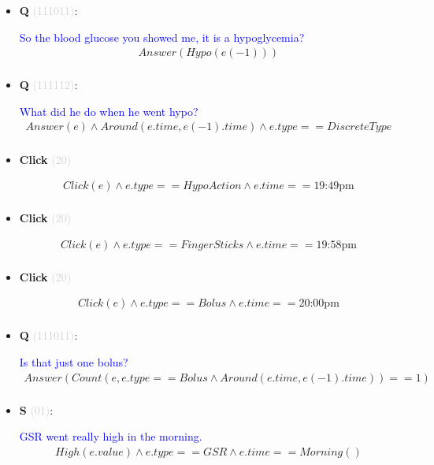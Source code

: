 \documentclass[11pt]{article}
\newcounter{CQ}
\newcounter{CS}
\newcounter{CClick}
\newcommand{\key}[1]{\textcolor{lightgray}{#1}}
\begin{document}
\begin{itemize}
	
	\item
	\textbf{Q\theCQ} \key{(111011)}: \addtocounter{CQ}{1}
	\textcolor{blue}{ So the blood glucose you showed me, it is a hypoglycemia? }
	\begin{multline*}
	Answer(Hypo(e(-1)))\\
	\end{multline*}
	
	
	\item
	\textbf{Q\theCQ} \key{(111112)}: \addtocounter{CQ}{1}
	\textcolor{blue}{ What did he do when he went hypo? }
	\begin{multline*}
	Answer(e) \wedge Around(e.time, e(-1).time) \wedge e.type==DiscreteType \\
	\end{multline*}
	
	
	\item
	\textbf{Click\theCClick} \key{(20)} \addtocounter{CClick}{1}
	\begin{multline*}
	Click(e) \wedge e.type == HypoAction \wedge e.time == \mbox{19:49pm}\\
	\end{multline*}
	
	
	\item
	\textbf{Click\theCClick} \key{(20)} \addtocounter{CClick}{1}
	\begin{multline*}
	Click(e) \wedge e.type == FingerSticks \wedge e.time == \mbox{19:58pm} \\
	\end{multline*}
	
	\item
	\textbf{Click\theCClick} \key{(20)} \addtocounter{CClick}{1}
	\begin{multline*}
	Click(e) \wedge e.type == Bolus \wedge e.time == \mbox{20:00pm}  \\
	\end{multline*}
	
	\item
	\textbf{Q\theCQ} \key{(111011)}: \addtocounter{CQ}{1}
	\textcolor{blue}{ Is that just one bolus? }
	\begin{multline*}
	Answer(Count(e, e.type==Bolus \wedge Around(e.time, e(-1).time))==1) \\
	\end{multline*}
	
	
	\item
	\textbf{S\theCS} \key{(01)}: \addtocounter{CS}{1}
	\textcolor{blue}{ GSR went really high in the morning. }
	\begin{multline*}
	High(e.value) \wedge e.type==GSR \wedge e.time==Morning() \\
	\end{multline*}
	

\end{itemize}
\end{document}
